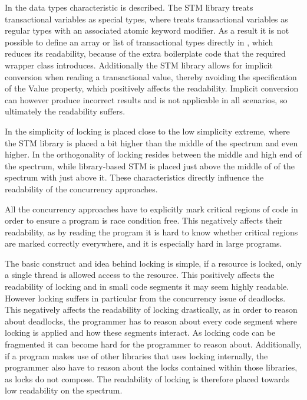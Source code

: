 In  the data types characteristic is described. The \ac{STM} library treats transactional variables as special types, where \stmname treats transactional variables as regular types with an associated atomic keyword modifier. As a result it is not possible to define an array or list of transactional types directly in \stmname, which reduces its readability, because of the extra boilerplate code that the required wrapper class introduces. Additionally the \ac{STM} library allows for implicit conversion when reading a transactional value, thereby avoiding the specification of the Value property, which positively affects the readability. Implicit conversion can however produce incorrect results and is not applicable in all scenarios, so ultimately the readability suffers.

In  the simplicity of locking is placed close to the low simplicity extreme, where the \ac{STM} library is placed a bit higher than the middle of the spectrum and \stmname even higher. In  the orthogonality of locking resides between the middle and high end of the spectrum, while library-based \ac{STM} is placed just above the middle of of the spectrum with \stmname just above it. These characteristics directly influence the readability of the concurrency approaches.

All the concurrency approaches have to explicitly mark critical regions of code in order to ensure a program is race condition free. This negatively affects their readability, as by reading the program it is hard to know whether critical regions are marked correctly everywhere, and it is especially hard in large programs.

The basic  construct and idea behind locking is simple, if a resource is locked, only a single thread is allowed access to the resource. This positively affects the readability of locking and in small code segments it may seem highly readable. However locking suffers in particular from the concurrency issue of deadlocks. This negatively affects the readability of locking drastically, as in order to reason about deadlocks, the programmer has to reason about every code segment where locking is applied and how these segments interact. As locking code can be fragmented it can become hard for the programmer to reason about. Additionally, if a program makes use of other libraries that uses locking internally, the programmer also have to reason about the locks contained within those libraries, as locks do not compose. The readability of locking is therefore placed towards low readability on the spectrum.

